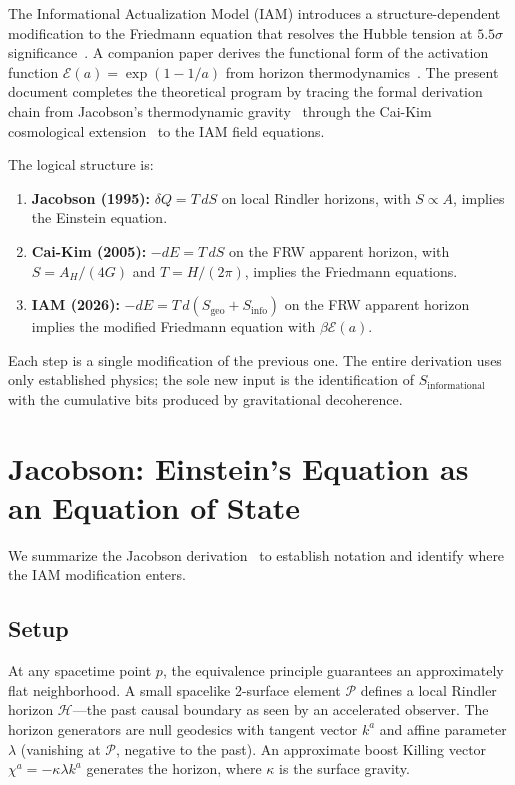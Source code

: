 \documentclass[aps,prd,twocolumn,superscriptaddress,nofootinbib]{revtex4-2}
\begin{document}
The Informational Actualization Model (IAM) introduces a structure-dependent modification to the Friedmann equation that resolves the Hubble tension at $5.5\sigma$ significance~\cite{Mahaffey2026main,Mahaffey2026compendium}. A companion paper derives the functional form of the activation function $\mathcal{E}(a) = \exp(1-1/a)$ from horizon thermodynamics~\cite{Mahaffey2026holographic}. The present document completes the theoretical program by tracing the formal derivation chain from Jacobson's thermodynamic gravity~\cite{Jacobson1995} through the Cai-Kim cosmological extension~\cite{Cai2005} to the IAM field equations.

The logical structure is:
\begin{enumerate}
\item \textbf{Jacobson (1995):} $\delta Q = T\,dS$ on local Rindler horizons, with $S \propto A$, implies the Einstein equation.
\item \textbf{Cai-Kim (2005):} $-dE = T\,dS$ on the FRW apparent horizon, with $S = A_H/(4G)$ and $T = H/(2\pi)$, implies the Friedmann equations.
\item \textbf{IAM (2026):} $-dE = T\,d(S_\text{geo} + S_\text{info})$ on the FRW apparent horizon implies the modified Friedmann equation with $\beta\mathcal{E}(a)$.
\end{enumerate}

Each step is a single modification of the previous one. The entire derivation uses only established physics; the sole new input is the identification of $S_\text{informational}$ with the cumulative bits produced by gravitational decoherence.

\section{Jacobson: Einstein's Equation as an Equation of State}
\label{sec:jacobson}

We summarize the Jacobson derivation~\cite{Jacobson1995} to establish notation and identify where the IAM modification enters.

\subsection{Setup}

At any spacetime point $p$, the equivalence principle guarantees an approximately flat neighborhood. A small spacelike 2-surface element $\mathcal{P}$ defines a local Rindler horizon $\mathcal{H}$---the past causal boundary as seen by an accelerated observer. The horizon generators are null geodesics with tangent vector $k^a$ and affine parameter $\lambda$ (vanishing at $\mathcal{P}$, negative to the past). An approximate boost Killing vector $\chi^a = -\kappa\lambda k^a$ generates the horizon, where $\kappa$ is the surface gravity.
\end{document}
